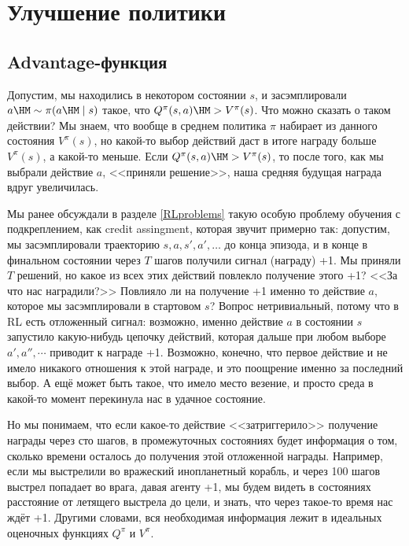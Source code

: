 \section{Улучшение политики}\label{PIsection} 

\subsection{Advantage-функция}\label{subsection:advantage}

Допустим, мы находились в некотором состоянии $s$, и засэмплировали $a \HM\sim \pi(a \HM\mid s)$ такое, что $Q^\pi(s, a) \HM> V^\pi(s)$. Что можно сказать о таком действии? Мы знаем, что вообще в среднем политика $\pi$ набирает из данного состояния $V^\pi(s)$, но какой-то выбор действий даст в итоге награду больше $V^\pi(s)$, а какой-то меньше. Если $Q^\pi(s, a) \HM> V^\pi(s)$, то после того, как мы выбрали действие $a$, <<приняли решение>>, наша средняя будущая награда вдруг увеличилась.

Мы ранее обсуждали в разделе \ref{RLproblems} такую особую проблему обучения с подкреплением, как credit assingment, которая звучит примерно так: допустим, мы засэмплировали траекторию $s, a, s', a', \dots $ до конца эпизода, и в конце в финальном состоянии через $T$ шагов получили сигнал (награду) +1. Мы приняли $T$ решений, но какое из всех этих действий повлекло получение этого +1? <<За что нас наградили?>> Повлияло ли на получение +1 именно то действие $a$, которое мы засэмплировали в стартовом $s$? Вопрос нетривиальный, потому что в RL есть отложенный сигнал: возможно, именно действие $a$ в состоянии $s$ запустило какую-нибудь цепочку действий, которая дальше при любом выборе $a', a'', \cdots$ приводит к награде +1. Возможно, конечно, что первое действие и не имело никакого отношения к этой награде, и это поощрение именно за последний выбор. А ещё может быть такое, что имело место везение, и просто среда в какой-то момент перекинула нас в удачное состояние.

Но мы понимаем, что если какое-то действие <<затриггерило>> получение награды через сто шагов, в промежуточных состояниях будет информация о том, сколько времени осталось до получения этой отложенной награды. Например, если мы выстрелили во вражеский инопланетный корабль, и через 100 шагов выстрел попадает во врага, давая агенту +1, мы будем видеть в состояниях расстояние от летящего выстрела до цели, и знать, что через такое-то время нас ждёт +1. Другими словами, вся необходимая информация лежит в идеальных оценочных функциях $Q^\pi$ и $V^\pi$.

